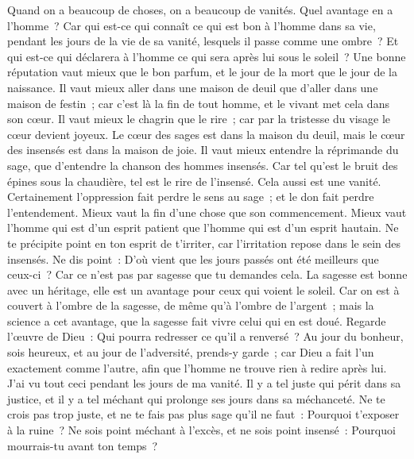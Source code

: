 \begin{multicols}{2}
Quand on a beaucoup de choses, on a beaucoup de vanités. Quel avantage en a l'homme~? 
Car qui est-ce qui connaît ce qui est bon à l'homme dans sa vie, pendant les jours de la vie de sa vanité, lesquels il passe comme une ombre~? Et qui est-ce qui déclarera à l'homme ce qui sera après lui sous le soleil~?
\VerseOne{}Une bonne réputation vaut mieux que le bon parfum, et le jour de la mort que le jour de la naissance.
Il vaut mieux aller dans une maison de deuil que d'aller dans une maison de festin~; car c'est là la fin de tout homme, et le vivant met cela dans son cœur.
Il vaut mieux le chagrin que le rire~; car par la tristesse du visage le cœur devient joyeux.
Le cœur des sages est dans la maison du deuil, mais le cœur des insensés est dans la maison de joie.
Il vaut mieux entendre la réprimande du sage, que d'entendre la chanson des hommes insensés.
Car tel qu'est le bruit des épines sous la chaudière, tel est le rire de l'insensé. Cela aussi est une vanité. 
Certainement l'oppression fait perdre le sens au sage~; et le don fait perdre l'entendement. 
Mieux vaut la fin d'une chose que son commencement. Mieux vaut l'homme qui est d'un esprit patient que l'homme qui est d'un esprit hautain. 
Ne te précipite point en ton esprit de t'irriter, car l'irritation repose dans le sein des insensés.
Ne dis point~: D'où vient que les jours passés ont été meilleurs que ceux-ci~? Car ce n'est pas par sagesse que tu demandes cela. 
La sagesse est bonne avec un héritage, elle est un avantage pour ceux qui voient le soleil.
Car on est à couvert à l'ombre de la sagesse, de même qu'à l'ombre de l'argent~; mais la science a cet avantage, que la sagesse fait vivre celui qui en est doué. 
Regarde l'œuvre de Dieu~: Qui pourra redresser ce qu'il a renversé~?
Au jour du bonheur, sois heureux, et au jour de l'adversité, prends-y garde~; car Dieu a fait l'un exactement comme l'autre, afin que l'homme ne trouve rien à redire après lui. 
J'ai vu tout ceci pendant les jours de ma vanité. Il y a tel juste qui périt dans sa justice, et il y a tel méchant qui prolonge ses jours dans sa méchanceté.
Ne te crois pas trop juste, et ne te fais pas plus sage qu'il ne faut~: Pourquoi t'exposer à la ruine~?
Ne sois point méchant à l'excès, et ne sois point insensé~: Pourquoi mourrais-tu avant ton temps~?

\end{multicols}
